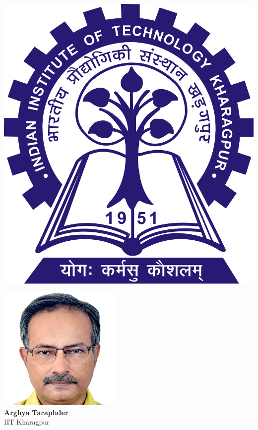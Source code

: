 \documentclass[10pt,aspectratio=169]{beamer}
\begin{document}
\begin{frame}{}
\hspace*{\fill}
\begin{minipage}{0.1\textwidth}
	\includegraphics[width=\textwidth]{IITKGP.png}\\
\end{minipage}
\hspace*{\fill}
\begin{minipage}{0.3\textwidth}
	\centering
	\includegraphics[width=0.45\textwidth]{arghya.jpg}\\
	\footnotesize{{\bf Arghya Taraphder}\\
	IIT Kharagpur}
\end{minipage}
\hspace*{\fill}

\end{frame}
\end{document}
